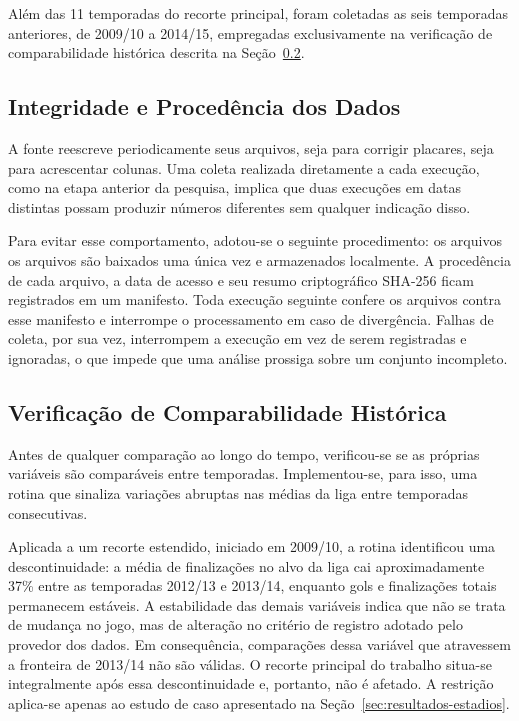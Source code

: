 Além das 11 temporadas do recorte principal, foram coletadas as seis temporadas
anteriores, de 2009/10 a 2014/15, empregadas exclusivamente na verificação de
comparabilidade histórica descrita na Seção~\ref{sec:quebras}.

\subsection{Integridade e Procedência dos Dados}\label{sec:integridade}

A fonte reescreve periodicamente seus arquivos, seja para corrigir placares, seja
para acrescentar colunas. Uma coleta realizada diretamente a cada execução, como
na etapa anterior da pesquisa, implica que duas execuções em datas distintas
possam produzir números diferentes sem qualquer indicação disso.

Para evitar esse comportamento, adotou-se o seguinte procedimento: os arquivos
os arquivos são baixados uma única vez e armazenados localmente. A procedência
de cada arquivo, a data de acesso e seu resumo criptográfico SHA-256 ficam
registrados em um manifesto. Toda execução seguinte confere os arquivos contra
esse manifesto e interrompe o processamento em caso de divergência. Falhas de
coleta, por sua vez, interrompem a execução em vez de serem registradas e
ignoradas, o que impede que uma análise prossiga sobre um conjunto incompleto.

\subsection{Verificação de Comparabilidade Histórica}\label{sec:quebras}

Antes de qualquer comparação ao longo do tempo, verificou-se se as próprias
variáveis são comparáveis entre temporadas. Implementou-se, para isso, uma
rotina que sinaliza variações abruptas nas médias da liga entre temporadas
consecutivas.

Aplicada a um recorte estendido, iniciado em 2009/10, a rotina identificou uma
descontinuidade: a média de finalizações no alvo da liga cai aproximadamente
37\% entre as temporadas 2012/13 e 2013/14, enquanto gols e finalizações totais
permanecem estáveis. A estabilidade das demais variáveis indica que não se trata
de mudança no jogo, mas de alteração no critério de registro adotado pelo
provedor dos dados. Em consequência, comparações dessa variável que atravessem a
fronteira de 2013/14 não são válidas. O recorte principal do trabalho situa-se
integralmente após essa descontinuidade e, portanto, não é afetado. A restrição
aplica-se apenas ao estudo de caso apresentado na
Seção~\ref{sec:resultados-estadios}.

